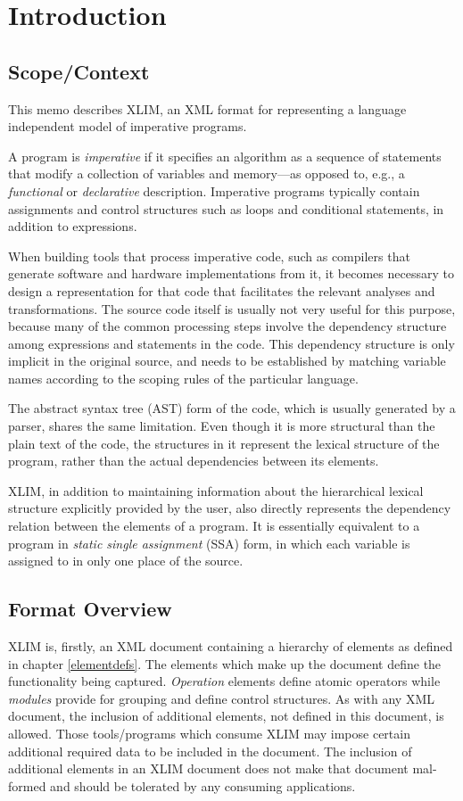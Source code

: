
\chapter{Introduction}\label{chap:Introduction}

\section{Scope/Context}
This memo describes XLIM, an XML format for representing a
language independent model of imperative programs.

A program is {\em imperative} if it specifies an algorithm as a
sequence of statements that modify a collection of variables and
memory---as opposed to, e.g., a {\em functional} or {\em declarative}
description. Imperative programs typically contain assignments and
control structures such as loops and conditional statements, in
addition to expressions.

When building tools that process imperative code, such as compilers
that generate software and hardware implementations from it, it
becomes necessary to design a representation for that code that
facilitates the relevant analyses and transformations. The source code
itself is usually not very useful for this purpose, because many of
the common processing steps involve the dependency structure among
expressions and statements in the code. This dependency structure is
only implicit in the original source, and needs to be established by
matching variable names according to the scoping rules of the
particular language.

The abstract syntax tree (AST) form of the code, which is usually
generated by a parser, shares the same limitation. Even though it is
more structural than the plain text of the code, the structures in it
represent the lexical structure of the program, rather than the actual
dependencies between its elements.

XLIM, in addition to maintaining information about the hierarchical
lexical structure explicitly provided by the user, also directly
represents the dependency relation between the elements of a program.
It is essentially equivalent to a program in {\em static single assignment}
(SSA) form, in which each variable is assigned to in only one place of
the source.

\section{Format Overview}
XLIM is, firstly, an XML document containing a hierarchy of elements as
defined in chapter \ref{elementdefs}.  The elements which make up the
document define the functionality being captured.  {\it Operation} elements
define atomic operators while {\it modules} provide for grouping and
define control structures.  As with any XML document, the inclusion of
additional elements, not defined in this document, is allowed.  Those
tools/programs which consume XLIM may impose certain additional
required data to be included in the document.  The inclusion of additional
elements in an XLIM document does not make that document mal-formed
and should be tolerated by any consuming applications.


